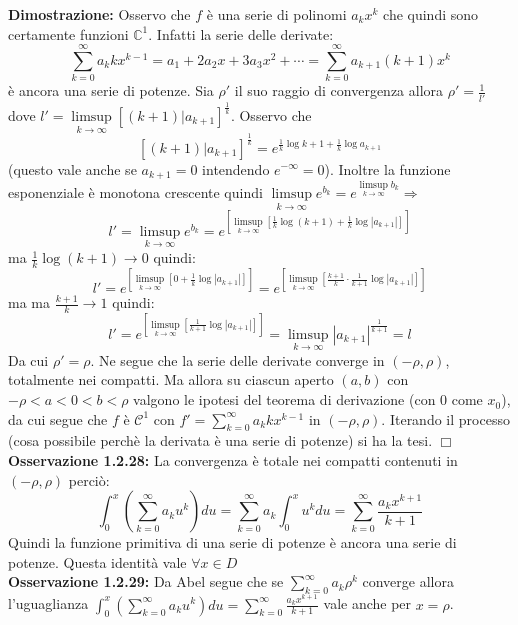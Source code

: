 \documentclass[a4paper,11pt,titlepage]{book}
\begin{document}
\textbf{Dimostrazione:} Osservo che $f$ è una serie di polinomi $a_kx^k$ che quindi sono certamente funzioni $\mathbb{C}^1$. Infatti la serie delle derivate: $$\sum_{k=0}^\infty a_k k x^{k-1}=a_1+2a_2x+3a_3x^2+\cdots =\sum_{k=0}^\infty a_{k+1} (k+1) x^{k}$$ è ancora una serie di potenze. Sia $\rho'$ il suo raggio di convergenza allora $\rho'=\frac{1}{l'}$ dove $l'=\limsup\limits_{k\to\infty}[(k+1)|a_{k+1}]^{\frac{1}{k}}$. Osservo che $$[(k+1)|a_{k+1}]^{\frac{1}{k}}=e^{\frac{1}{k}\log{k+1}+\frac{1}{k}\log{a_{k+1}}}$$ (questo vale anche se $a_{k+1}=0$ intendendo $e^{-\infty}=0$). Inoltre la funzione esponenziale è monotona crescente quindi $\limsup\limits_{k\to\infty} e^{b_k}=e^{\limsup\limits_{k\to\infty} b_k}\Rightarrow$ $$l'=\limsup\limits_{k\to\infty}e^{b_k}=e^{[\limsup\limits_{k\to\infty}[\frac{1}{k}\log(k+1)+\frac{1}{k}\log|a_{k+1}|]]}$$ ma $\frac{1}{k}\log(k+1)\to 0$ quindi: $$l'=e^{[\limsup\limits_{k\to\infty}[0+\frac{1}{k}\log|a_{k+1}|]]}=e^{[\limsup\limits_{k\to\infty}[\frac{k+1}{k}\cdot\frac{1}{k+1}\log|a_{k+1}|]]}$$ ma ma $\frac{k+1}{k}\to 1$ quindi: $$l'=e^{[\limsup\limits_{k\to\infty}[\frac{1}{k+1}\log|a_{k+1}|]]}=\limsup\limits_{k\to\infty}|a_{k+1}|^{\frac{1}{k+1}}=l$$ Da cui $\rho'=\rho$. Ne segue che la serie delle derivate converge in $(-\rho,\rho)$, totalmente nei compatti. Ma allora su ciascun aperto $(a,b)$ con $-\rho<a<0<b<\rho$ valgono le ipotesi del teorema di derivazione (con $0$ come $x_0$), da cui segue che $f$ è $\mathcal{C}^1$ con $f'=\sum_{k=0}^\infty a_kkx^{k-1}$ in $(-\rho,\rho)$.  Iterando il processo (cosa possibile perchè la derivata è una serie di potenze) si ha la tesi. $\Box$\\

\textbf{Osservazione 1.2.28:} La convergenza è totale nei compatti contenuti in $(-\rho,\rho)$ perciò: $$\int_0^x(\sum_{k=0}^\infty a_ku^k)du=\sum_{k=0}^\infty a_k\int_0^xu^kdu=\sum_{k=0}^\infty \frac{a_kx^{k+1}}{k+1}$$ Quindi la funzione primitiva di una serie di potenze è ancora una serie di potenze. Questa identità vale $\forall x \in D$\\

\textbf{Osservazione 1.2.29:} Da Abel segue che se $\sum_{k=0}^\infty a_k\rho^k$ converge allora l'uguaglianza $\int_0^x(\sum_{k=0}^\infty a_ku^k)du=\sum_{k=0}^\infty \frac{a_kx^{k+1}}{k+1}$ vale anche per $x=\rho$.\\ 
\end{document}
